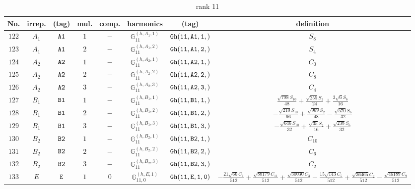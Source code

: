 \documentclass[fleqn,8pt]{jsarticle}
\begin{document}
\begin{table}[ht!]
\begin{center}
\caption{rank 11}
\renewcommand{\arraystretch}{1.3}
\begin{tabular}{cccccccc} \hline \hline
No. & irrep. & (tag) & mul. & comp. & harmonics & (tag) & definition \\ \hline
$ 122 $ & $ A_{1} $ & $ {\tt A1} $ & $ 1 $ & $ - $ & $ \mathbb{G}_{11}^{(h,A_{1},1)} $ & $ {\tt Gh(11,A1,1,)} $ & $ S_{8} $ \\
$ 123 $ & $ A_{1} $ & $ {\tt A1} $ & $ 2 $ & $ - $ & $ \mathbb{G}_{11}^{(h,A_{1},2)} $ & $ {\tt Gh(11,A1,2,)} $ & $ S_{4} $ \\
$ 124 $ & $ A_{2} $ & $ {\tt A2} $ & $ 1 $ & $ - $ & $ \mathbb{G}_{11}^{(h,A_{2},1)} $ & $ {\tt Gh(11,A2,1,)} $ & $ C_{0} $ \\
$ 125 $ & $ A_{2} $ & $ {\tt A2} $ & $ 2 $ & $ - $ & $ \mathbb{G}_{11}^{(h,A_{2},2)} $ & $ {\tt Gh(11,A2,2,)} $ & $ C_{8} $ \\
$ 126 $ & $ A_{2} $ & $ {\tt A2} $ & $ 3 $ & $ - $ & $ \mathbb{G}_{11}^{(h,A_{2},3)} $ & $ {\tt Gh(11,A2,3,)} $ & $ C_{4} $ \\
$ 127 $ & $ B_{1} $ & $ {\tt B1} $ & $ 1 $ & $ - $ & $ \mathbb{G}_{11}^{(h,B_{1},1)} $ & $ {\tt Gh(11,B1,1,)} $ & $ \frac{\sqrt{798} S_{10}}{48} + \frac{\sqrt{255} S_{2}}{24} + \frac{3 \sqrt{6} S_{6}}{16} $ \\
$ 128 $ & $ B_{1} $ & $ {\tt B1} $ & $ 2 $ & $ - $ & $ \mathbb{G}_{11}^{(h,B_{1},2)} $ & $ {\tt Gh(11,B1,2,)} $ & $ - \frac{\sqrt{210} S_{10}}{96} + \frac{\sqrt{969} S_{2}}{48} - \frac{\sqrt{570} S_{6}}{32} $ \\
$ 129 $ & $ B_{1} $ & $ {\tt B1} $ & $ 3 $ & $ - $ & $ \mathbb{G}_{11}^{(h,B_{1},3)} $ & $ {\tt Gh(11,B1,3,)} $ & $ - \frac{\sqrt{646} S_{10}}{32} + \frac{\sqrt{35} S_{2}}{16} + \frac{\sqrt{238} S_{6}}{32} $ \\
$ 130 $ & $ B_{2} $ & $ {\tt B2} $ & $ 1 $ & $ - $ & $ \mathbb{G}_{11}^{(h,B_{2},1)} $ & $ {\tt Gh(11,B2,1,)} $ & $ C_{10} $ \\
$ 131 $ & $ B_{2} $ & $ {\tt B2} $ & $ 2 $ & $ - $ & $ \mathbb{G}_{11}^{(h,B_{2},2)} $ & $ {\tt Gh(11,B2,2,)} $ & $ C_{6} $ \\
$ 132 $ & $ B_{2} $ & $ {\tt B2} $ & $ 3 $ & $ - $ & $ \mathbb{G}_{11}^{(h,B_{2},3)} $ & $ {\tt Gh(11,B2,3,)} $ & $ C_{2} $ \\
$ 133 $ & $ E $ & $ {\tt E} $ & $ 1 $ & $ 0 $ & $ \mathbb{G}_{11,0}^{(h,E,1)} $ & $ {\tt Gh(11,E,1,0)} $ & $ - \frac{21 \sqrt{66} C_{1}}{512} + \frac{\sqrt{88179} C_{11}}{512} + \frac{\sqrt{30030} C_{3}}{512} - \frac{15 \sqrt{143} C_{5}}{512} + \frac{\sqrt{36465} C_{7}}{512} - \frac{\sqrt{46189} C_{9}}{512} $ \\

\end{tabular}
\end{center}
\end{table}
\end{document}

